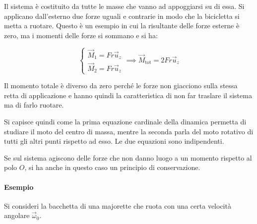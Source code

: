 \FloatBarrier
Il sistema è costituito da tutte le masse che vanno ad appoggiarsi su di essa.  Si applicano dall'esterno due forze uguali e contrarie in modo che la bicicletta si metta a ruotare. Questo è un esempio in cui la risultante delle forze esterne è zero, ma i momenti delle forze si sommano e si ha:

\[
	\begin{cases} \vec{M}_1=Fr\vec{u}_z \\ \vec{M}_2=Fr\vec{u}_z \end{cases} \implies \vec{M}_\text{tot}=2Fr\vec{u}_z
\]

Il momento totale è diverso da zero perché le forze non giacciono sulla stessa retta di applicazione e hanno quindi la caratteristica di non far traslare il sistema ma di farlo ruotare.

Si capisce quindi come la prima equazione cardinale della dinamica permetta di studiare il moto del centro di massa, mentre la seconda parla del moto rotativo di tutti gli altri punti rispetto ad esso. Le due equazioni sono indipendenti.

Se sul sistema agiscono delle forze che non danno luogo a un momento rispetto al polo $O$, si ha anche in questo caso un principio di conservazione.

\paragraph{Esempio} Si consideri la bacchetta di una majorette che ruota con una certa velocità angolare $\vec{\omega}_0$.

